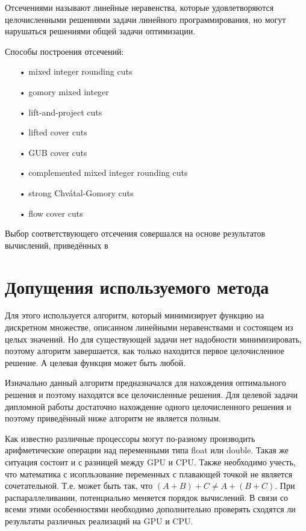 \documentclass[a4paper,14pt,russian]{extreport}
\begin{document}
\par
Отсечениями называют линейные неравенства, которые удовлетворяются целочисленными решениями задачи линейного программирования, но могут нарушаться решениями общей задачи оптимизации.
\par
Способы построения отсечений:
\begin{itemize}
\item[•] mixed integer rounding cuts \cite{nemhauser_wolsey}
\item[•] gomory mixed integer \cite{gomory}
\item[•] lift-and-project cuts \cite{balas_ceria_corn} \cite{balas_ceria_corn_1}
\item[•] lifted cover cuts \cite{balas}\cite{balas_zemel}\cite{martin_weismantel}
\item[•] GUB cover cuts \cite{wolsey}
\item[•] complemented mixed integer rounding cuts \cite{marchand_wolsey}
\item[•] strong Chvátal-Gomory cuts \cite{chvatal} \cite{letchford_lodi}
\item[•] flow cover cuts \cite{padberg} \cite{van_roy}
\end{itemize}
\par
Выбор соответствующего отсечения совершался на основе результатов вычислений, приведённых в \cite{achterberg}

\section{Допущения используемого метода}

Для этого используется алгоритм, который минимизирует функцию на дискретном множестве, описанном линейными неравенствами и состоящем из целых значений. Но для существующей задачи нет надобности минимизировать, поэтому алгоритм завершается, как только находится первое целочисленное решение. А целевая функция может быть любой. 
\par
Изначально данный алгоритм предназначался для нахождения оптимального решения и поэтому находятся все целочисленные решения. Для целевой задачи дипломной работы достаточно нахождение одного целочисленного решения и поэтому приведённый ниже алгоритм не является полным. 
\par
Как известно различные процессоры могут по-разному производить арифметические операции над переменными типа float или double. Такая же ситуация состоит и с разницей между GPU и CPU. Также необходимо учесть, что математика с исопльзование переменных с плавающей точкой не является сочетательной. Т.е. может быть так, что $(A+B)+C\neq A+(B+C)$. При распараллеливании, потенциально меняется порядок вычислений. В связи со всеми этими особенностями необходимо дополнительно проверять сходятся ли результаты различных реализаций на GPU и CPU. 
\par
\end{document}
